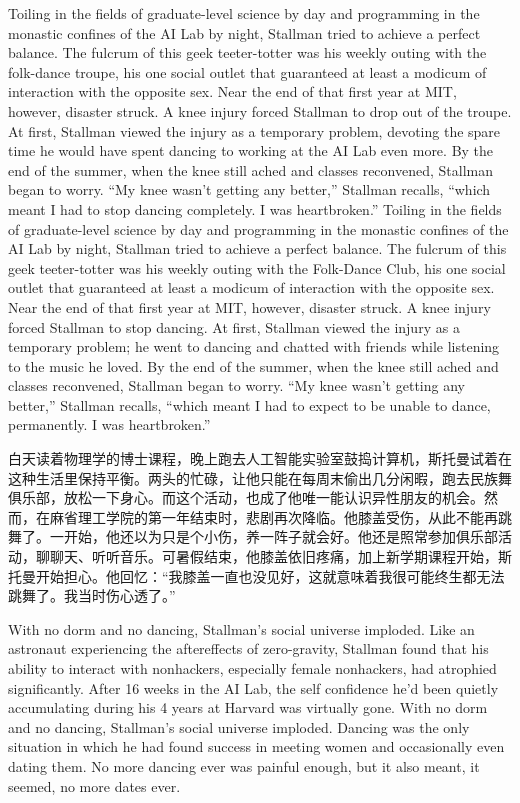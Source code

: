 \ifdefined\eng
\ifdefined\vone
Toiling in the fields of graduate-level science by day and programming in the monastic confines of the AI Lab by night, Stallman tried to achieve a perfect balance. The fulcrum of this geek teeter-totter was his weekly outing with the folk-dance troupe, his one social outlet that guaranteed at least a modicum of interaction with the opposite sex. Near the end of that first year at MIT, however, disaster struck. A knee injury forced Stallman to drop out of the troupe. At first, Stallman viewed the injury as a temporary problem, devoting the spare time he would have spent dancing to working at the AI Lab even more. By the end of the summer, when the knee still ached and classes reconvened, Stallman began to worry. ``My knee wasn't getting any better,'' Stallman recalls, ``which meant I had to stop dancing completely. I was heartbroken.''
\fi
\ifdefined\vtwo
Toiling in the fields of graduate-level science by day and programming in the monastic confines of the AI Lab by night, Stallman tried to achieve a perfect balance. The fulcrum of this geek teeter-totter was his weekly outing with the Folk-Dance Club, his one social outlet that guaranteed at least a modicum of interaction with the opposite sex. Near the end of that first year at MIT, however, disaster struck. A knee injury forced Stallman to stop dancing. At first, Stallman viewed the injury as a temporary problem; he went to dancing and chatted with friends while listening to the music he loved. By the end of the summer, when the knee still ached and classes reconvened, Stallman began to worry. ``My knee wasn't getting any better,'' Stallman recalls, ``which meant I had to expect to be unable to dance, permanently. I was heartbroken.''
\fi
\fi

\ifdefined\chs
白天读着物理学的博士课程，晚上跑去人工智能实验室鼓捣计算机，斯托曼试着在这种生活里保持平衡。两头的忙碌，让他只能在每周末偷出几分闲暇，跑去民族舞俱乐部，放松一下身心。而这个活动，也成了他唯一能认识异性朋友的机会。然而，在麻省理工学院的第一年结束时，悲剧再次降临。他膝盖受伤，从此不能再跳舞了。一开始，他还以为只是个小伤，养一阵子就会好。他还是照常参加俱乐部活动，聊聊天、听听音乐。可暑假结束，他膝盖依旧疼痛，加上新学期课程开始，斯托曼开始担心。他回忆：``我膝盖一直也没见好，这就意味着我很可能终生都无法跳舞了。我当时伤心透了。''
\fi

\ifdefined\eng
\ifdefined\vone
With no dorm and no dancing, Stallman's social universe imploded. Like an astronaut experiencing the aftereffects of zero-gravity, Stallman found that his ability to interact with nonhackers, especially female nonhackers, had atrophied significantly. After 16 weeks in the AI Lab, the self confidence he'd been quietly accumulating during his 4 years at Harvard was virtually gone.
\fi
\ifdefined\vtwo
With no dorm and no dancing, Stallman's social universe imploded. Dancing was the only situation in which he had found success in meeting women and occasionally even dating them. No more dancing ever was painful enough, but it also meant, it seemed, no more dates ever.
\fi
\fi

